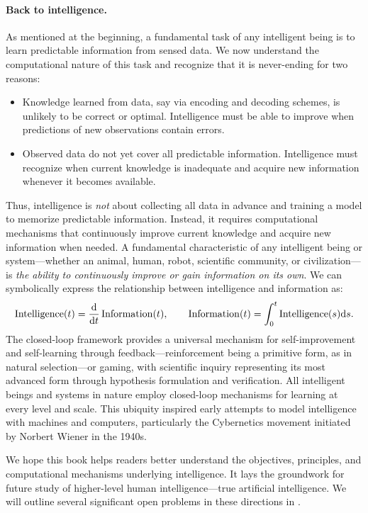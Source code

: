 \documentclass[../../book-main.tex]{subfiles}
\begin{document}
\paragraph{Back to intelligence.}
As mentioned at the beginning, a fundamental task of any intelligent being is to learn predictable information from sensed data. We now understand the computational nature of this task and recognize that it is never-ending for two reasons:
\begin{itemize}
    \item Knowledge learned from data, say via encoding and decoding schemes, is unlikely to be correct or optimal. Intelligence must be able to improve when predictions of new observations contain errors.
    \item Observed data do not yet cover all predictable information. Intelligence must recognize when current knowledge is inadequate and acquire new information whenever it becomes available.
\end{itemize}

Thus, intelligence is \textit{not} about collecting all data in advance and training a model to memorize predictable information. Instead, it requires computational mechanisms that continuously improve current knowledge and acquire new information when needed. A fundamental characteristic of any intelligent being or system---whether an animal, human, robot, scientific community, or civilization---is \textit{the ability to continuously improve or gain information on its own}. We can symbolically express the relationship between intelligence and information as:
\begin{equation}
\operatorname{Intelligence}(t) = \odv*{\operatorname{Information}}{t}(t), \qquad 
\operatorname{Information}(t)  = \int_0^t \operatorname{Intelligence}(s) \odif{s}.
\end{equation}
The closed-loop framework provides a universal mechanism for self-improvement and self-learning through feedback---reinforcement being a primitive form, as in natural selection---or gaming, with scientific inquiry representing its most advanced form through hypothesis formulation and verification. All intelligent beings and systems in nature employ closed-loop mechanisms for learning at every level and scale. This ubiquity inspired early attempts to model intelligence with machines and computers, particularly the Cybernetics movement initiated by Norbert Wiener in the 1940s.

We hope this book helps readers better understand the objectives, principles, and computational mechanisms underlying intelligence. It lays the groundwork for future study of higher-level human intelligence---true artificial intelligence. We will outline several significant open problems in these directions in .
\end{document}
